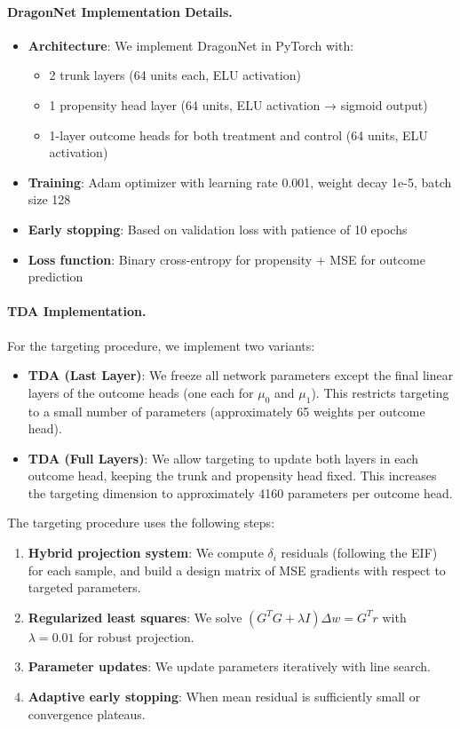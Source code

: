\documentclass{article}
\theoremstyle{remark}
\begin{document}
\paragraph{DragonNet Implementation Details.}
\begin{itemize}[leftmargin=15pt]
\item \textbf{Architecture}: We implement DragonNet in PyTorch with:
    \begin{itemize}
        \item 2 trunk layers (64 units each, ELU activation)
        \item 1 propensity head layer (64 units, ELU activation → sigmoid output)
        \item 1-layer outcome heads for both treatment and control (64 units, ELU activation)
    \end{itemize}
\item \textbf{Training}: Adam optimizer with learning rate 0.001, weight decay 1e-5, batch size 128
\item \textbf{Early stopping}: Based on validation loss with patience of 10 epochs
\item \textbf{Loss function}: Binary cross-entropy for propensity + MSE for outcome prediction

\end{itemize}

\paragraph{TDA Implementation.}
For the targeting procedure, we implement two variants:
\begin{itemize}[leftmargin=15pt]
\item \textbf{TDA (Last Layer)}: We freeze all network parameters except the final linear layers of the outcome heads (one each for $\mu_0$ and $\mu_1$). This restricts targeting to a small number of parameters (approximately 65 weights per outcome head).
\item \textbf{TDA (Full Layers)}: We allow targeting to update both layers in each outcome head, keeping the trunk and propensity head fixed. This increases the targeting dimension to approximately 4160 parameters per outcome head.
\end{itemize}
The targeting procedure uses the following steps:
\begin{enumerate}[leftmargin=15pt]
\item \textbf{Hybrid projection system}: We compute $\delta_i$ residuals (following the EIF) for each sample, and build a design matrix of MSE gradients with respect to targeted parameters.
\item \textbf{Regularized least squares}: We solve $(G^TG + \lambda I)\Delta w = G^T r$ with $\lambda = 0.01$ for robust projection.
\item \textbf{Parameter updates}: We update parameters iteratively with line search.
\item \textbf{Adaptive early stopping}: When mean residual is sufficiently small or convergence plateaus.
\end{enumerate}
\end{document}
